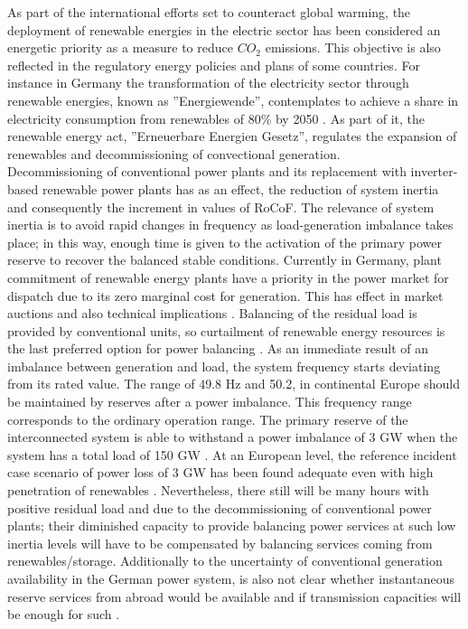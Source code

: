 As part of the international efforts set to counteract global warming, the deployment of renewable energies in the electric sector has been considered an energetic priority as a measure to reduce $CO_{2}$ emissions. This objective is also reflected in the regulatory energy policies and plans of some countries. For instance in Germany the transformation of the electricity sector through renewable energies, known as ''Energiewende”, contemplates to achieve a share in electricity consumption from renewables of 80\% by 2050 \cite{AgoraEnergiewende.}. As part of it, the renewable energy act, ''Erneuerbare Energien Gesetz”, regulates the expansion of renewables and decommissioning of convectional generation.\\

Decommissioning of conventional power plants and its replacement with inverter-based renewable power plants has as an effect, the reduction of system inertia and consequently the increment in values of RoCoF. The relevance of system inertia is to avoid rapid changes in frequency as load-generation imbalance takes place; in this way, enough time is given to the activation of the primary power reserve to recover the balanced stable conditions. Currently in Germany, plant commitment of renewable energy plants have a priority in the power market for dispatch due to its zero marginal cost for generation. This has effect in market auctions and also technical implications \cite{energiewende2017flexibility}. Balancing of the residual load is provided by conventional units, so curtailment of renewable energy resources is the last preferred option for power balancing \cite{dena2014}. As an immediate result of an imbalance between generation and load, the system frequency starts deviating from its rated value. The range of 49.8 Hz and 50.2, in continental Europe should be maintained by reserves after a power imbalance. This frequency range corresponds to the ordinary operation range. The primary reserve of the interconnected system is able to withstand a power imbalance of 3 GW when the system has a total load of 150 GW \cite{ENTSOE.2016}. At an European level, the reference incident case scenario of power loss of 3 GW has been found adequate even with high penetration of renewables \cite{ENTSOE.2016, dena2014}. Nevertheless, there still will be  many hours with positive residual load and due to the decommissioning of conventional power plants; their diminished capacity to provide balancing power services at such low inertia levels will have to be compensated by balancing services coming from renewables/storage. Additionally to the uncertainty of conventional generation availability in the German power system, is also not clear whether instantaneous reserve services from abroad would be available and if transmission capacities will be enough for such \cite{dena2014}.\\

